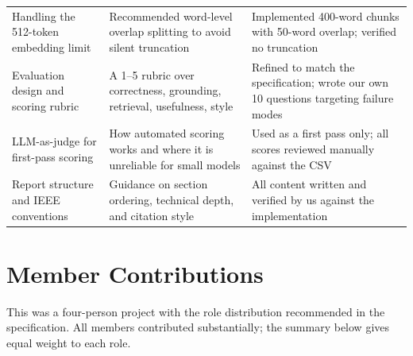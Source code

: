 \begin{longtable}{@{}p{3.4cm} p{6.2cm} p{6.2cm}@{}}
Handling the 512-token embedding limit &
Recommended word-level overlap splitting to avoid silent truncation &
Implemented 400-word chunks with 50-word overlap; verified no truncation \\
Evaluation design and scoring rubric &
A 1--5 rubric over correctness, grounding, retrieval, usefulness, style &
Refined to match the specification; wrote our own 10 questions targeting
failure modes \\
LLM-as-judge for first-pass scoring &
How automated scoring works and where it is unreliable for small models &
Used as a first pass only; all scores reviewed manually against the CSV \\
Report structure and IEEE conventions &
Guidance on section ordering, technical depth, and citation style &
All content written and verified by us against the implementation \\
\end{longtable}

\section{Member Contributions}
\label{app:contributions}

This was a four-person project with the role distribution recommended in
the specification. All members contributed substantially; the summary
below gives equal weight to each role.

